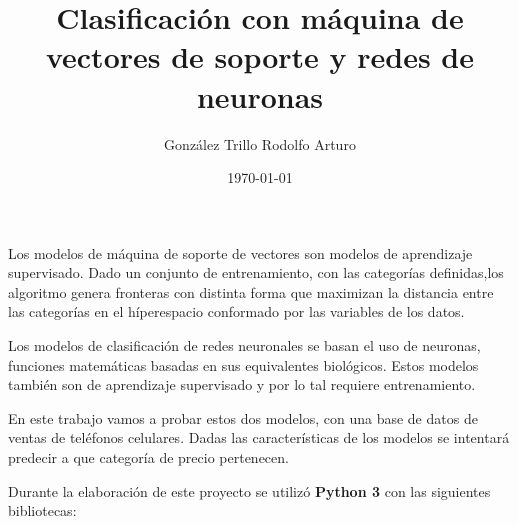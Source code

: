 \documentclass[12pt,twocolumn,a4paper]{apa_article}
\author{González Trillo Rodolfo Arturo}
\title{Clasificación con máquina de vectores de soporte y redes de neuronas}
\date{\today}
\begin{document}
Los modelos de máquina de soporte de vectores son modelos de aprendizaje supervisado. Dado un conjunto de entrenamiento, con las categorías definidas,los algoritmo genera fronteras con distinta forma que maximizan la distancia entre las categorías en el híperespacio conformado por las variables de los datos. 

Los modelos de clasificación de redes neuronales se basan el uso de neuronas, funciones matemáticas basadas en sus equivalentes biológicos. Estos modelos también son de aprendizaje supervisado y por lo tal requiere entrenamiento.

En este trabajo vamos a probar estos dos modelos, con una base de datos de ventas de teléfonos celulares. Dadas las características de los modelos se intentará predecir a que categoría de precio pertenecen.



Durante la elaboración de este proyecto se utilizó \textbf{Python 3} con las siguientes bibliotecas: 
\end{document}
